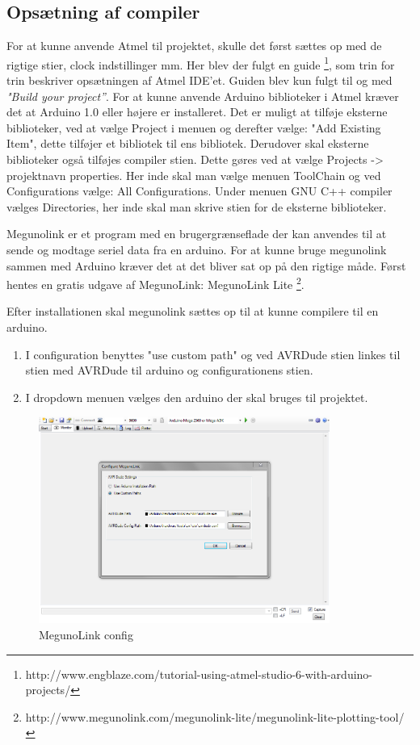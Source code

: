 \subsection{Opsætning af compiler}


For at kunne anvende Atmel til projektet, skulle det først sættes op med de rigtige stier, clock indstillinger mm. Her blev der fulgt en guide \footnote{http://www.engblaze.com/tutorial-using-atmel-studio-6-with-arduino-projects/}, som trin for trin beskriver opsætningen af Atmel IDE'et. Guiden blev kun fulgt til og med \textit{"Build your project”}. 
For at kunne anvende Arduino biblioteker i Atmel kræver det at Arduino 1.0 eller højere er installeret. Det er muligt at tilføje eksterne biblioteker, ved at vælge Project i menuen og derefter vælge: "Add Existing Item", dette tilføjer et bibliotek til ens bibliotek. Derudover skal eksterne biblioteker også tilføjes compiler stien. Dette gøres ved at vælge Projects -> projektnavn properties. Her inde skal man vælge menuen ToolChain og ved Configurations vælge: All Configurations. Under menuen GNU C++ compiler vælges Directories, her inde skal man skrive stien for de eksterne biblioteker.

Megunolink er et program med en brugergrænseflade der kan anvendes til at sende og modtage seriel data fra en arduino.
For at kunne bruge megunolink sammen med Arduino kræver det at det bliver sat op på den rigtige måde.
Først hentes en gratis udgave af MegunoLink: MegunoLink Lite \footnote{http://www.megunolink.com/megunolink-lite/megunolink-lite-plotting-tool/}.

Efter installationen skal megunolink sættes op til at kunne compilere til en arduino.

\begin{enumerate}
	\item I configuration benyttes "use custom path" og ved AVRDude stien linkes til stien med AVRDude til arduino og configurationens stien. 
	\item I dropdown menuen vælges den arduino der skal bruges til projektet.
\end{enumerate}

\newpage

\begin{figure}[H]
	\centering
	\includegraphics[width=0.85\textwidth]{Billeder/implementation/megunolink_config.png}
	\vspace{-.5cm}
	\caption{MegunoLink config}
	\label{fig:meglinkconf}
\end{figure}

